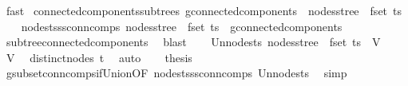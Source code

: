 \begin{isabellebody}
\ fast\isanewline
{}\isamarkupfalse%
%
\endisatagproof
{\isafoldproof}%
%
\isadelimproof
\isanewline
%
\endisadelimproof
\isanewline
{}\isamarkupfalse%
\ connected{\isacharunderscore}{\kern0pt}components{\isacharunderscore}{\kern0pt}subtrees{\isacharcolon}{\kern0pt}\ {\isachardoublequoteopen}g{\isacharprime}{\kern0pt}{\isachardot}{\kern0pt}connected{\isacharunderscore}{\kern0pt}components\ {\isacharequal}{\kern0pt}\ nodes{\isacharunderscore}{\kern0pt}stree\ {\isacharbackquote}{\kern0pt}\ fset\ ts{\isachardoublequoteclose}\isanewline
%
\isadelimproof
%
\endisadelimproof
%
\isatagproof
{}\isamarkupfalse%
{\isacharminus}{\kern0pt}\isanewline
\ \ \isamarkupfalse%
\ nodes{\isacharunderscore}{\kern0pt}ts{\isacharunderscore}{\kern0pt}ss{\isacharunderscore}{\kern0pt}conn{\isacharunderscore}{\kern0pt}comps{\isacharcolon}{\kern0pt}\ {\isachardoublequoteopen}nodes{\isacharunderscore}{\kern0pt}stree\ {\isacharbackquote}{\kern0pt}\ fset\ ts\ {\isasymsubseteq}\ g{\isacharprime}{\kern0pt}{\isachardot}{\kern0pt}connected{\isacharunderscore}{\kern0pt}components{\isachardoublequoteclose}\ \isamarkupfalse%
\ subtree{\isacharunderscore}{\kern0pt}connected{\isacharunderscore}{\kern0pt}components\ \isamarkupfalse%
\ blast\isanewline
\ \ \isamarkupfalse%
\ Un{\isacharunderscore}{\kern0pt}nodes{\isacharunderscore}{\kern0pt}ts{\isacharcolon}{\kern0pt}\ {\isachardoublequoteopen}{\isasymUnion}{\isacharparenleft}{\kern0pt}nodes{\isacharunderscore}{\kern0pt}stree\ {\isacharbackquote}{\kern0pt}\ fset\ ts{\isacharparenright}{\kern0pt}\ {\isacharequal}{\kern0pt}\ V{\isacharprime}{\kern0pt}{\isachardoublequoteclose}\ \isamarkupfalse%
\ V{\isacharprime}{\kern0pt}\ \isamarkupfalse%
\ distinct{\isacharunderscore}{\kern0pt}nodes\ t\ \isamarkupfalse%
\ auto\isanewline
\ \ \isamarkupfalse%
\ {\isacharquery}{\kern0pt}thesis\ \isamarkupfalse%
\ g{\isacharprime}{\kern0pt}{\isachardot}{\kern0pt}subset{\isacharunderscore}{\kern0pt}conn{\isacharunderscore}{\kern0pt}comps{\isacharunderscore}{\kern0pt}if{\isacharunderscore}{\kern0pt}Union{\isacharbrackleft}{\kern0pt}OF\ nodes{\isacharunderscore}{\kern0pt}ts{\isacharunderscore}{\kern0pt}ss{\isacharunderscore}{\kern0pt}conn{\isacharunderscore}{\kern0pt}comps\ Un{\isacharunderscore}{\kern0pt}nodes{\isacharunderscore}{\kern0pt}ts{\isacharbrackright}{\kern0pt}\ \isamarkupfalse%
\ simp\isanewline
{}\isamarkupfalse%
%
\endisatagproof

\end{isabellebody}
